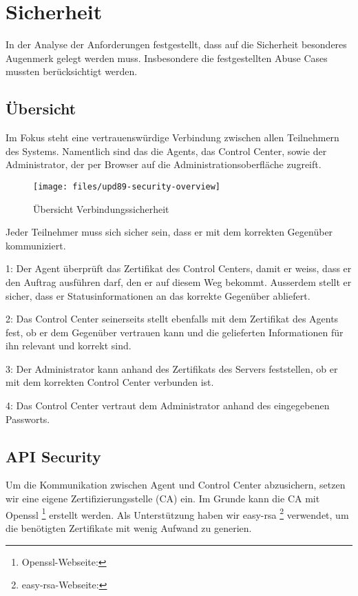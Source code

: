 \section{Sicherheit}

In der Analyse der Anforderungen festgestellt, dass auf die Sicherheit besonderes Augenmerk gelegt werden muss. Insbesondere die festgestellten Abuse Cases mussten berücksichtigt werden.

\subsection*{Übersicht}

Im Fokus steht eine vertrauenswürdige Verbindung zwischen allen Teilnehmern des Systems. Namentlich sind das die Agents, das Control Center, sowie der Administrator, der per Browser auf die Administrationsoberfläche zugreift.

\begin{figure}
  \centering
    \texttt{[image: files/upd89-security-overview]}
  \caption{Übersicht Verbindungssicherheit}
  \label{fig:sec-overview}
\end{figure}

Jeder Teilnehmer muss sich sicher sein, dass er mit dem korrekten Gegenüber kommuniziert.

1: Der Agent überprüft das Zertifikat des Control Centers, damit er weiss, dass er den Auftrag ausführen darf, den er auf diesem Weg bekommt. Ausserdem stellt er sicher, dass er Statusinformationen an das korrekte Gegenüber abliefert.

2: Das Control Center seinerseits stellt ebenfalls mit dem Zertifikat des Agents fest, ob er dem Gegenüber vertrauen kann und die gelieferten Informationen für ihn relevant und korrekt sind.

3: Der Administrator kann anhand des Zertifikats des Servers feststellen, ob er mit dem korrekten Control Center verbunden ist.

4: Das Control Center vertraut dem Administrator anhand des eingegebenen Passworts.

\subsection*{API Security}

Um die Kommunikation zwischen Agent und Control Center abzusichern, setzen wir eine eigene Zertifizierungsstelle (CA) ein. Im Grunde kann die CA mit Openssl \footnote{Openssl-Webseite: } erstellt werden. Als Unterstützung haben wir easy-rsa \footnote{easy-rsa-Webseite: } verwendet, um die benötigten Zertifikate mit wenig Aufwand zu generien.

